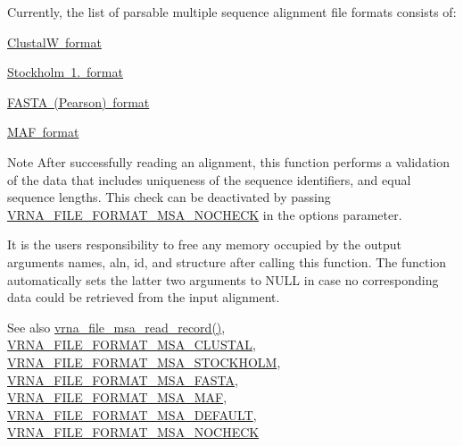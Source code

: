 Currently, the list of parsable multiple sequence alignment file formats consists of\+:
\begin{DoxyItemize}
\item \mbox{\hyperlink{file_formats_msa-formats-clustal}{ClustalW format}}
\item \mbox{\hyperlink{file_formats_msa-formats-stockholm}{Stockholm 1. format}}
\item \mbox{\hyperlink{file_formats_msa-formats-fasta}{F\+A\+S\+TA (Pearson) format}}
\item \mbox{\hyperlink{file_formats_msa-formats-maf}{M\+AF format}}
\end{DoxyItemize}\begin{DoxyNote}{Note}
After successfully reading an alignment, this function performs a validation of the data that includes uniqueness of the sequence identifiers, and equal sequence lengths. This check can be deactivated by passing \mbox{\hyperlink{group__file__formats__msa_ga229fb3778ecabea4782902b69fa48fd1}{V\+R\+N\+A\+\_\+\+F\+I\+L\+E\+\_\+\+F\+O\+R\+M\+A\+T\+\_\+\+M\+S\+A\+\_\+\+N\+O\+C\+H\+E\+CK}} in the {\ttfamily options} parameter.

It is the users responsibility to free any memory occupied by the output arguments {\ttfamily names}, {\ttfamily aln}, {\ttfamily id}, and {\ttfamily structure} after calling this function. The function automatically sets the latter two arguments to {\ttfamily N\+U\+LL} in case no corresponding data could be retrieved from the input alignment.
\end{DoxyNote}
\begin{DoxySeeAlso}{See also}
\mbox{\hyperlink{group__file__formats__msa_gad4203a438622b2df7bc2f16578d54799}{vrna\+\_\+file\+\_\+msa\+\_\+read\+\_\+record()}}, \mbox{\hyperlink{group__file__formats__msa_ga79a23de2c7249f2cccd762e475c81859}{V\+R\+N\+A\+\_\+\+F\+I\+L\+E\+\_\+\+F\+O\+R\+M\+A\+T\+\_\+\+M\+S\+A\+\_\+\+C\+L\+U\+S\+T\+AL}}, \mbox{\hyperlink{group__file__formats__msa_ga62be992445cd8ab2ad7a8fded944338b}{V\+R\+N\+A\+\_\+\+F\+I\+L\+E\+\_\+\+F\+O\+R\+M\+A\+T\+\_\+\+M\+S\+A\+\_\+\+S\+T\+O\+C\+K\+H\+O\+LM}}, \mbox{\hyperlink{group__file__formats__msa_gacf6274a2c825f34e4131404665b00604}{V\+R\+N\+A\+\_\+\+F\+I\+L\+E\+\_\+\+F\+O\+R\+M\+A\+T\+\_\+\+M\+S\+A\+\_\+\+F\+A\+S\+TA}}, \mbox{\hyperlink{group__file__formats__msa_gab3186d774c01570d2a47d0308eec4927}{V\+R\+N\+A\+\_\+\+F\+I\+L\+E\+\_\+\+F\+O\+R\+M\+A\+T\+\_\+\+M\+S\+A\+\_\+\+M\+AF}}, \mbox{\hyperlink{group__file__formats__msa_ga4acc255373831856a8417b68de8a94c0}{V\+R\+N\+A\+\_\+\+F\+I\+L\+E\+\_\+\+F\+O\+R\+M\+A\+T\+\_\+\+M\+S\+A\+\_\+\+D\+E\+F\+A\+U\+LT}}, \mbox{\hyperlink{group__file__formats__msa_ga229fb3778ecabea4782902b69fa48fd1}{V\+R\+N\+A\+\_\+\+F\+I\+L\+E\+\_\+\+F\+O\+R\+M\+A\+T\+\_\+\+M\+S\+A\+\_\+\+N\+O\+C\+H\+E\+CK}}
\end{DoxySeeAlso}

